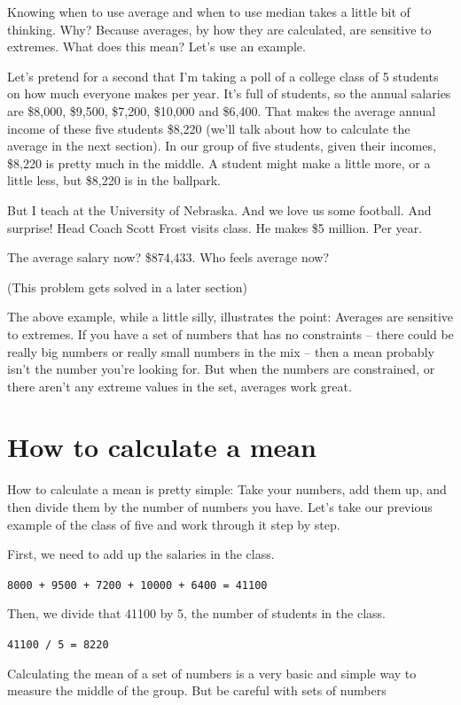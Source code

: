 \documentclass[
]{book}
\begin{document}
Knowing when to use average and when to use median takes a little bit of thinking. Why? Because averages, by how they are calculated, are sensitive to extremes. What does this mean? Let's use an example.

Let's pretend for a second that I'm taking a poll of a college class of 5 students on how much everyone makes per year. It's full of students, so the annual salaries are \$8,000, \$9,500, \$7,200, \$10,000 and \$6,400. That makes the average annual income of these five students \$8,220 (we'll talk about how to calculate the average in the next section). In our group of five students, given their incomes, \$8,220 is pretty much in the middle. A student might make a little more, or a little less, but \$8,220 is in the ballpark.

But I teach at the University of Nebraska. And we love us some football. And surprise! Head Coach Scott Frost visits class. He makes \$5 million. Per year.

The average salary now? \$874,433. Who feels average now?

(This problem gets solved in a later section)

The above example, while a little silly, illustrates the point: Averages are sensitive to extremes. If you have a set of numbers that has no constraints -- there could be really big numbers or really small numbers in the mix -- then a mean probably isn't the number you're looking for. But when the numbers are constrained, or there aren't any extreme values in the set, averages work great.

\hypertarget{how-to-calculate-a-mean}{%
\section{How to calculate a mean}\label{how-to-calculate-a-mean}}

How to calculate a mean is pretty simple: Take your numbers, add them up, and then divide them by the number of numbers you have. Let's take our previous example of the class of five and work through it step by step.

First, we need to add up the salaries in the class.

\texttt{8000\ +\ 9500\ +\ 7200\ +\ 10000\ +\ 6400\ =\ 41100}

Then, we divide that 41100 by 5, the number of students in the class.

\texttt{41100\ /\ 5\ =\ 8220}

Calculating the mean of a set of numbers is a very basic and simple way to measure the middle of the group. But be careful with sets of numbers
\end{document}
